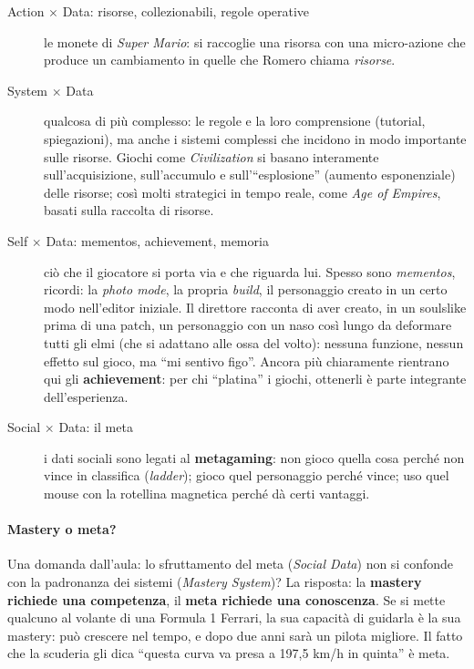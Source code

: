 \begin{description}
  \item[Action $\times$ Data: risorse, collezionabili, regole operative] le
        monete di \emph{Super Mario}: si raccoglie una risorsa con una
        micro-azione che produce un cambiamento in quelle che Romero chiama
        \emph{risorse}.
  \item[System $\times$ Data] qualcosa di più complesso: le regole e la loro
        comprensione (tutorial, spiegazioni), ma anche i sistemi complessi che
        incidono in modo importante sulle risorse. Giochi come
        \emph{Civilization} si basano interamente sull'acquisizione,
        sull'accumulo e sull'``esplosione'' (aumento esponenziale) delle
        risorse; così molti strategici in tempo reale, come \emph{Age of
        Empires}, basati sulla raccolta di risorse.
  \item[Self $\times$ Data: mementos, achievement, memoria] ciò che il
        giocatore si porta via e che riguarda lui. Spesso sono
        \emph{mementos}, ricordi: la \emph{photo mode}, la propria
        \emph{build}, il personaggio creato in un certo modo nell'editor
        iniziale. Il direttore racconta di aver creato, in un soulslike prima
        di una patch, un personaggio con un naso così lungo da deformare tutti
        gli elmi (che si adattano alle ossa del volto): nessuna funzione,
        nessun effetto sul gioco, ma ``mi sentivo figo''. Ancora più
        chiaramente rientrano qui gli \textbf{achievement}: per chi
        ``platina'' i giochi, ottenerli è parte integrante dell'esperienza.
  \item[Social $\times$ Data: il meta] i dati sociali sono legati al
        \textbf{metagaming}: non gioco quella cosa perché non vince in
        classifica (\emph{ladder}); gioco quel personaggio perché vince; uso
        quel mouse con la rotellina magnetica perché dà certi vantaggi.
\end{description}

\paragraph{Mastery o meta?} Una domanda dall'aula: lo sfruttamento del meta
(\emph{Social Data}) non si confonde con la padronanza dei sistemi
(\emph{Mastery System})? La risposta: la \textbf{mastery richiede una
competenza}, il \textbf{meta richiede una conoscenza}. Se si mette qualcuno al
volante di una Formula 1 Ferrari, la sua capacità di guidarla è la sua
mastery: può crescere nel tempo, e dopo due anni sarà un pilota migliore. Il
fatto che la scuderia gli dica ``questa curva va presa a 197,5 km/h in
quinta'' è meta.

